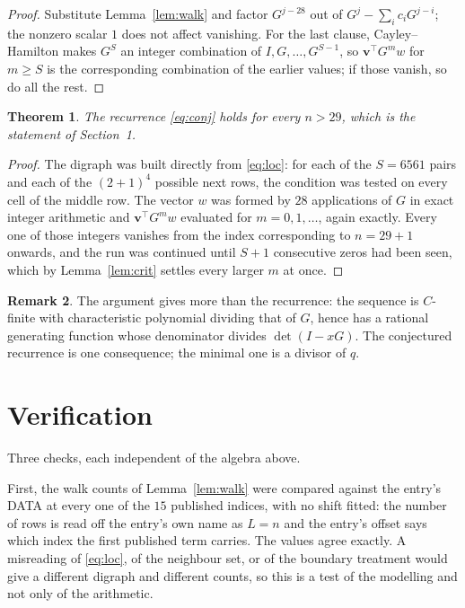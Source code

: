 \documentclass[11pt,a4paper]{article}
\theoremstyle{plain}
\newtheorem{theorem}{Theorem}
\theoremstyle{definition}
\newtheorem{remark}[theorem]{Remark}
\begin{document}
\begin{proof}
Substitute Lemma~\ref{lem:walk} and factor $G^{j-28}$ out of
$G^{j}-\sum_ic_iG^{j-i}$; the nonzero scalar $1$ does not affect
vanishing. For the last clause, Cayley--Hamilton makes $G^{S}$ an integer combination of
$I,G,\dots,G^{S-1}$, so $\mathbf{v}^{\!\top}G^{m}w$ for $m\ge S$ is the corresponding
combination of the earlier values; if those vanish, so do all the rest.
\end{proof}

\begin{theorem}
The recurrence \eqref{eq:conj} holds for every $n>29$, which is the statement of
Section~1.
\end{theorem}

\begin{proof}
The digraph was built directly from \eqref{eq:loc}: for each of the $S=6561$ pairs and each
of the $(2+1)^{4}$ possible next rows, the condition was tested on every cell of
the middle row. The vector $w$ was formed by $28$ applications of $G$ in exact integer
arithmetic and $\mathbf{v}^{\!\top}G^{m}w$ evaluated for $m=0,1,\dots$, again exactly.
Every one of those integers vanishes from the index corresponding to $n=29+1$ onwards,
and the run was continued until $S+1$ consecutive zeros had been seen, which by
Lemma~\ref{lem:crit} settles every larger $m$ at once.
\end{proof}

\begin{remark}
The argument gives more than the recurrence: the sequence is $C$-finite with characteristic
polynomial dividing that of $G$, hence has a rational generating function whose denominator
divides $\det(I-xG)$. The conjectured recurrence is one consequence; the minimal one is a
divisor of $q$.
\end{remark}

\section{Verification}

Three checks, each independent of the algebra above.

First, the walk counts of Lemma~\ref{lem:walk} were compared against the entry's DATA at
every one of the $15$ published indices, with no shift fitted: the number of rows is
read off the entry's own name as $L=n$ and the entry's offset says which index the first
published term carries. The values agree exactly. A misreading of \eqref{eq:loc}, of the
neighbour set, or of the boundary treatment would give a different digraph and different
counts, so this is a test of the modelling and not only of the arithmetic.
\end{document}
